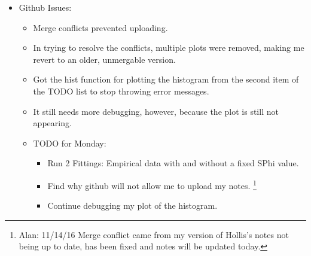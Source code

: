 \documentclass[11pt]{labbook}
\begin{document}
    \begin{itemize}
        \item Github Issues:
            \begin{itemize}
                \item Merge conflicts prevented uploading.
                \item In trying to resolve the conflicts, multiple plots were removed, making me revert to an older, unmergable version.
                \item Got the hist function for plotting the histogram from the second item of the TODO list to stop throwing error messages.
                \item It still needs more debugging, however, because the plot is still not appearing.
                \item TODO for Monday:
                    \begin{itemize}
                        \item Run 2 Fittings: Empirical data with and without a fixed SPhi value.
                        \item Find why github will not allow me to upload my notes. \footnote{Alan: 11/14/16 Merge conflict came from my version of Hollis's notes not being up to date, has been fixed and notes will be updated today.}
                        \item Continue debugging my plot of the histogram.
                    \end{itemize}
            \end{itemize}
    \end{itemize}
\end{document}
